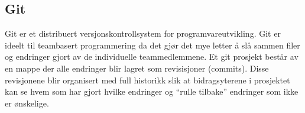 \documentclass[../main.tex]{subfiles}
\begin{document}
\subsection{Git}
Git er et distribuert versjonskontrollsystem for programvareutvikling. Git er ideelt til teambasert programmering da det gjør det mye letter å slå sammen filer og endringer gjort av de individuelle teammedlemmene. Et git prosjekt består av en mappe der alle endringer blir lagret som revisisjoner (commits). Disse revisjonene blir organisert med full historikk slik at bidragsyterene i prosjektet kan se hvem som har gjort hvilke endringer og “rulle tilbake” endringer som ikke er ønskelige. 

\newpage
\end{document}
